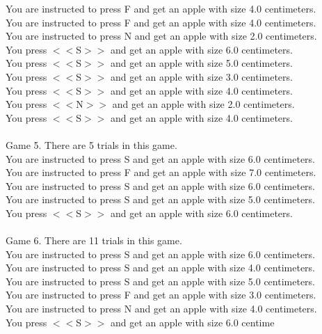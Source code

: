\documentclass[pdflatex,sn-nature]{sn-jnl}%
\theoremstyle{thmstyleone}%
\theoremstyle{thmstyletwo}%
\theoremstyle{thmstylethree}%
\begin{document}
You are instructed to press F and get an apple with size 4.0 centimeters. $~$\\ 
You are instructed to press F and get an apple with size 4.0 centimeters. $~$\\ 
You are instructed to press N and get an apple with size 2.0 centimeters. $~$\\ 
You press $<<$S$>>$ and get an apple with size 6.0 centimeters. $~$\\ 
You press $<<$S$>>$ and get an apple with size 5.0 centimeters. $~$\\ 
You press $<<$S$>>$ and get an apple with size 3.0 centimeters. $~$\\ 
You press $<<$S$>>$ and get an apple with size 4.0 centimeters. $~$\\ 
You press $<<$N$>>$ and get an apple with size 2.0 centimeters. $~$\\ 
You press $<<$S$>>$ and get an apple with size 4.0 centimeters. $~$\\ 
 $~$\\ 
Game 5. There are 5 trials in this game. $~$\\ 
You are instructed to press S and get an apple with size 6.0 centimeters. $~$\\ 
You are instructed to press F and get an apple with size 7.0 centimeters. $~$\\ 
You are instructed to press S and get an apple with size 6.0 centimeters. $~$\\ 
You are instructed to press S and get an apple with size 5.0 centimeters. $~$\\ 
You press $<<$S$>>$ and get an apple with size 6.0 centimeters. $~$\\ 
 $~$\\ 
Game 6. There are 11 trials in this game. $~$\\ 
You are instructed to press S and get an apple with size 6.0 centimeters. $~$\\ 
You are instructed to press S and get an apple with size 4.0 centimeters. $~$\\ 
You are instructed to press S and get an apple with size 5.0 centimeters. $~$\\ 
You are instructed to press F and get an apple with size 3.0 centimeters. $~$\\ 
You are instructed to press N and get an apple with size 4.0 centimeters. $~$\\ 
You press $<<$S$>>$ and get an apple with size 6.0 centime
\end{document}
